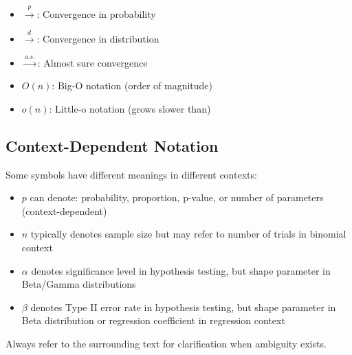 \begin{itemize}
    \item $\overset{p}{\to}$: Convergence in probability
    \item $\overset{d}{\to}$: Convergence in distribution
    \item $\overset{a.s.}{\to}$: Almost sure convergence
    \item $O(n)$: Big-O notation (order of magnitude)
    \item $o(n)$: Little-o notation (grows slower than)
\end{itemize}

\subsection{Context-Dependent Notation}

Some symbols have different meanings in different contexts:

\begin{itemize}
    \item $p$ can denote: probability, proportion, p-value, or number of parameters (context-dependent)
    \item $n$ typically denotes sample size but may refer to number of trials in binomial context
    \item $\alpha$ denotes significance level in hypothesis testing, but shape parameter in Beta/Gamma distributions
    \item $\beta$ denotes Type II error rate in hypothesis testing, but shape parameter in Beta distribution or regression coefficient in regression context
\end{itemize}

Always refer to the surrounding text for clarification when ambiguity exists.
